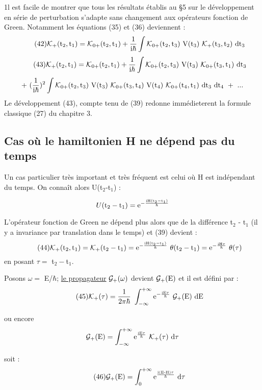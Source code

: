 1l est facile de montrer que tous les résultats établis au \S 5 sur le
développement en série de perturbation s'adapte sans changement aux opérateurs
fonction de Green. Notamment les équations (35) et (36) deviennent :
\[
\tag{42}\mc{K}_+(\mt{t}_2,\mt{t}_1)=\mc{K}_{0+}(\mt{t}_2,\mt{t}_1) + \frac{1}{\mt{i}\hbar}\int
\mc{K}_{0+}(\mt{t}_2,\mt{t}_3)\ \mt{V}(\mt{t}_3)\ \mc{K}_+(\mt{t}_3,\mt{t}_2)\ \mt{dt}_3
\]
\[
\tag{43}\mc{K}_+(\mt{t}_2,\mt{t}_1)=\mc{K}_{0+}(\mt{t}_2,\mt{t}_1) + \frac{1}{\mt{i}\hbar}\int
\mc{K}_{0+}(\mt{t}_2,\mt{t}_3)\ \mt{V}(\mt{t}_3)\ \mc{K}_{0+}(\mt{t}_3,\mt{t}_1)\ \mt{dt}_3
\]
\[
+\ (\frac{1}{\mt{i}\hbar})^2\int\mc{K}_{0+}(\mt{t}_2,\mt{t}_3)\ \mt{V}(\mt{t}_3)\ \mc{K}_{0+}(\mt{t}_3,\mt{t}_4)\ \mt{V}(\mt{t}_4)\ \mc{K}_{0+}(\mt{t}_4,\mt{t}_1)\ \mt{dt}_3\ \mt{dt}_4\ +\ ...
\]
Le développement (43), compte tenu de (39) redonne immédieterent la formule
classique (27) du chapitre 3.

\subsection{Cas où le hamiltonien H ne dépend pas du temps}%

Un cas particulier très important et très fréquent est celui où
H est indépendant du temps.
On connaît alors U(t$_2$-t$_1$) :

\[
U(\text{t}_2-\text{t}_1)=\text{e}^{-\frac{\text{iH}(\text{t}_2-\text{t}_1)}{\hbar}}
\]

L'opérateur fonction de Green ne dépend plus alors que de la différence
t$_2$ - t$_1$ (il y a invariance par translation dans le temps) et (39) devient :
\[
\tag{44}\mc{K}_+(\mt{t}_2,\mt{t}_1)=\mc{K}_+(\mt{t}_2-\mt{t}_1)=\mt{e}^{-\frac{\mt{iH}(\mt{t}_2-\mt{t}_1)}{\hbar}}\ \theta(\mt{t}_2-\mt{t}_1)
=\mt{e}^{-\frac{\mt{iH}\tau}{\hbar}}\ \theta(\tau)
\]
en posant $\tau=$ t$_2-$t$_1$.

Posons $\omega=$ E/$\hbar$; \ul{le propagateur} $\mathcal{G}_+(\omega)$ devient $\mathcal{G}_+(\text{E})$ et il est défini
par :
\[
\tag{45}\mc{K}_+(\tau)= \frac{1}{2\pi\hbar}\ \int_{-\infty}^{+\infty} \mt{e}^{-\frac{\mt{iE}\tau}{\hbar}}\ \mc{G}_+(\mt{E})\ \mt{dE}
\]


ou encore
\[
\mc{G}_+(\mt{E})=\int_{-\infty}^{+\infty} \mt{e}^{\frac{\mt{iE}\tau}{\hbar}}\ \mc{K}_+(\tau)\ \mt{d}\tau
\]

soit :
\[
\tag{46}\mathcal{G}_+(\text{E})=\int_0^{+\infty} \text{e}^{\frac{\text{i(E-H)}\tau}{\hbar}}\ \text{d}\tau
\]

